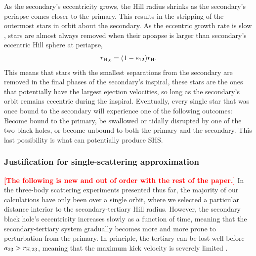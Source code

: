 \documentclass[a4paper,twocolumn]{emulateapj}
\newcommand{\colr}[1]{{\bf \textcolor{red}{[#1]}}}
\begin{document}
As the secondary's eccentricity grows, the Hill radius shrinks as the secondary's periapse comes closer to the primary. This results in the stripping of the outermost stars in orbit about the secondary. As the eccentric growth rate is slow \citep[$\sim 10^{8}$ yr,][]{Iwasawa:2011a}, stars are almost always removed when their apoapse is larger than secondary's eccentric Hill sphere at periapse,
\begin{equation}
r_{\rm H,e} = (1 - e_{12}) r_{\rm H}.
\end{equation}
This means that stars with the smallest separations from the secondary are removed in the final phases of the secondary's inspiral, these stars are the ones that potentially have the largest ejection velocities, so long as the secondary's orbit remains eccentric during the inspiral. Eventually, every single star that was once bound to the secondary will experience one of the following outcomes: Become bound to the primary, be swallowed or tidally disrupted by one of the two black holes, or become unbound to both the primary and the secondary. This last possibility is what can potentially produce SHS.

\subsubsection{Justification for single-scattering approximation}
\colr{The following is new and out of order with the rest of the paper.} In the three-body scattering experiments presented thus far, the majority of our calculations have only been over a single orbit, where we selected a particular distance interior to the secondary-tertiary Hill radius. However, the secondary black hole's eccentricity increases slowly as a function of time, meaning that the secondary-tertiary system gradually becomes more and more prone to perturbation from the primary. In principle, the tertiary can be lost well before $a_{23} > r_{{\rm H},23}$, meaning that the maximum kick velocity is severely limited \citep{Sari:2010a}.
\end{document}
